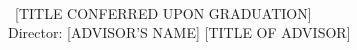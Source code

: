 \begin{center}
    \MyTitle \\
    \vspace*{0.5\baselineskip}
    \MyAuthor~[TITLE CONFERRED UPON GRADUATION] \\
    \vspace*{0.5\baselineskip}
    Director: [ADVISOR'S NAME] [TITLE OF ADVISOR]
\end{center}
\thispagestyle{empty}

\begingroup
\renewcommand{\clearpage}{}
\singlespacing



\lipsum[4-10] %

\noindent
\thispagestyle{empty}

\endgroup


